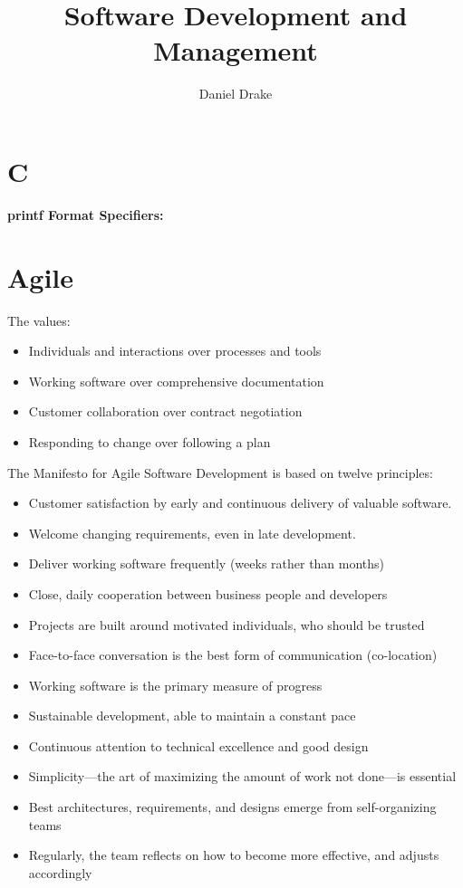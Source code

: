 \documentclass[12pt]{extarticle}
\title{Software Development and Management}
\author{Daniel Drake}
\theoremstyle{plain}
\theoremstyle{Definition}
\theoremstyle{Definition}
\theoremstyle{plain}
\begin{document}
		\maketitle			
		\section{C}
		\textbf{printf Format Specifiers: } \\ 
		
		\newpage
		\section{Agile}
		 The values:
		\begin{itemize}
			\item Individuals and interactions over processes and tools
			\item Working software over comprehensive documentation
			\item Customer collaboration over contract negotiation
			\item Responding to change over following a plan 
		\end{itemize}
		The Manifesto for Agile Software Development is based on twelve principles:
		\begin{itemize}
			\item Customer satisfaction by early and continuous delivery of valuable software.
			\item Welcome changing requirements, even in late development.
			\item Deliver working software frequently (weeks rather than months)
			\item Close, daily cooperation between business people and developers
			\item Projects are built around motivated individuals, who should be trusted
			\item Face-to-face conversation is the best form of communication (co-location)
			\item Working software is the primary measure of progress
			\item Sustainable development, able to maintain a constant pace
			\item Continuous attention to technical excellence and good design
			\item Simplicity—the art of maximizing the amount of work not done—is essential
			\item Best architectures, requirements, and designs emerge from self-organizing teams
			\item Regularly, the team reflects on how to become more effective, and adjusts accordingly
		\end{itemize}
			
			
			
			
			
			

		
		
\end{document}
